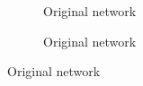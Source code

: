    \begin{figure}
        \begin{subfigure}{0.45\textwidth}
            \caption{Original network}
            \label{diff_sir_smaller}
        \end{subfigure}
        \begin{subfigure}{0.45\textwidth}
            \caption{Original network}
            \label{diff_sir_greater}
        \end{subfigure}

\end{figure}
